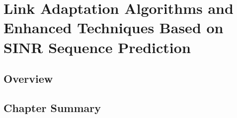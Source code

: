 \chapter{Link Adaptation Algorithms and Enhanced Techniques Based on SINR Sequence Prediction}
\label{chap:chp_LA}
\section{Overview}
\label{sec:ch4overview}
\section{Chapter Summary}
\label{sec:ch4summary}
